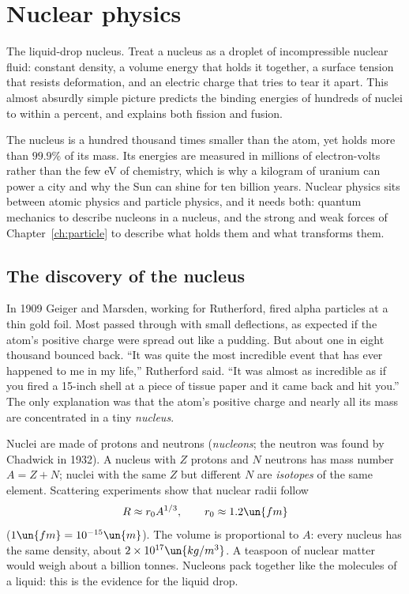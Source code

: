 \chapter{Nuclear physics}
\label{ch:nuclear}



\begin{prototype}
The liquid-drop nucleus. Treat a nucleus as a droplet of incompressible nuclear fluid: constant density, a volume energy that holds it together, a surface tension that resists deformation, and an electric charge that tries to tear it apart. This almost absurdly simple picture predicts the binding energies of hundreds of nuclei to within a percent, and explains both fission and fusion.
\end{prototype}

The nucleus is a hundred thousand times smaller than the atom, yet holds more than $99.9\%$ of its mass. Its energies are measured in millions of electron-volts rather than the few eV of chemistry, which is why a kilogram of uranium can power a city and why the Sun can shine for ten billion years. Nuclear physics sits between atomic physics and particle physics, and it needs both: quantum mechanics to describe nucleons in a nucleus, and the strong and weak forces of Chapter~\ref{ch:particle} to describe what holds them and what transforms them.

\section{The discovery of the nucleus}

In 1909 Geiger and Marsden, working for Rutherford, fired alpha particles at a thin gold foil. Most passed through with small deflections, as expected if the atom's positive charge were spread out like a pudding. But about one in eight thousand bounced back. ``It was quite the most incredible event that has ever happened to me in my life,'' Rutherford said. ``It was almost as incredible as if you fired a 15-inch shell at a piece of tissue paper and it came back and hit you.'' The only explanation was that the atom's positive charge and nearly all its mass are concentrated in a tiny \emph{nucleus}.

Nuclei are made of protons and neutrons (\emph{nucleons}; the neutron was found by Chadwick in 1932). A nucleus with $Z$ protons and $N$ neutrons has mass number $A = Z+N$; nuclei with the same $Z$ but different $N$ are \emph{isotopes} of the same element. Scattering experiments show that nuclear radii follow
\[
  R\approx r_0A^{1/3},\qquad r_0\approx1.2\un{fm}
\]
($1\un{fm} = 10^{-15}\un{m}$). The volume is proportional to $A$: every nucleus has the same density, about $2\times10^{17}\un{kg/m^3}$. A teaspoon of nuclear matter would weigh about a billion tonnes. Nucleons pack together like the molecules of a liquid: this is the evidence for the liquid drop.

